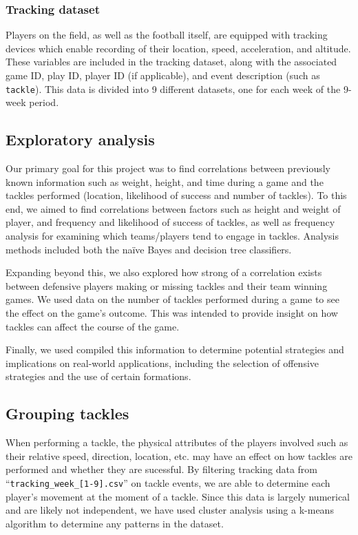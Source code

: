 \documentclass[bibtex, sigconf, hyperref={colorlinks=true,linkcolor=blue,urlcolor=blue}]{acmart}
\begin{document}
\subsubsection{Tracking dataset}

Players on the field, as well as the football itself, are equipped with
tracking devices which enable recording of their location, speed, acceleration,
and altitude. These variables are included in the tracking dataset, along with
the associated game ID, play ID, player ID (if applicable), and event
description (such as \verb|tackle|). This data is divided into 9 different datasets,
one for each week of the 9-week period.

\subsection{Exploratory analysis}

Our primary goal for this project was to find correlations between previously
known information such as weight, height, and time during a game and the
tackles performed (location, likelihood of success and number of tackles). To
this end, we aimed to find correlations between factors such as height and
weight of player, and frequency and likelihood of success of tackles, as well
as frequency analysis for examining which teams/players tend to engage in
tackles. Analysis methods included both the na\"ive Bayes and decision tree
classifiers.

Expanding beyond this, we also explored how strong of a correlation exists
between defensive players making or missing tackles and their team winning
games. We used data on the number of tackles performed during a game to see the
effect on the game's outcome. This was intended to provide insight on how
tackles can affect the course of the game.

Finally, we used compiled this information to determine potential strategies
and implications on real-world applications, including the selection of
offensive strategies and the use of certain formations.

\subsection{Grouping tackles}

When performing a tackle, the physical attributes of the players involved such
as their relative speed, direction, location, etc. may have an effect on how
tackles are performed and whether they are sucessful. By filtering tracking
data from ``\verb|tracking_week_[1-9].csv|'' on tackle events, we are able to
determine each player's movement at the moment of a tackle. Since this data is
largely numerical and are likely not independent, we have used cluster analysis
using a k-means algorithm to determine any patterns in the dataset.
\end{document}

